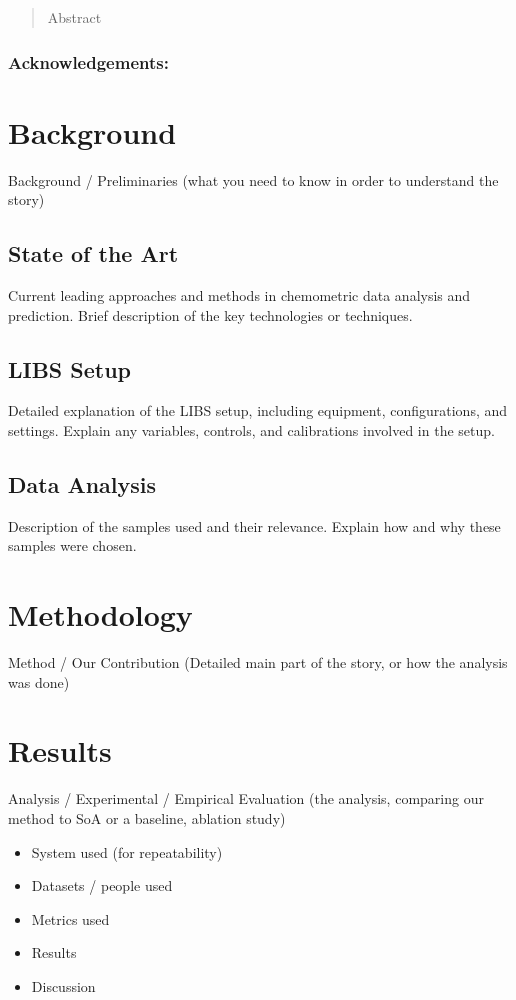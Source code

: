 
\newpage

\begin{abstract}
Abstract
\end{abstract}

\maketitle

\subsubsection*{Acknowledgements:}



\section{Background}
Background / Preliminaries (what you need to know in order to understand the story)
\subsection{State of the Art}
Current leading approaches and methods in chemometric data analysis and prediction.
Brief description of the key technologies or techniques.



\subsection{LIBS Setup}
Detailed explanation of the LIBS setup, including equipment, configurations, and settings.
Explain any variables, controls, and calibrations involved in the setup.

\subsection{Data Analysis}
Description of the samples used and their relevance.
Explain how and why these samples were chosen.

\section{Methodology}
Method / Our Contribution (Detailed main part of the story, or how the analysis was done)

\section{Results}
Analysis / Experimental / Empirical Evaluation (the analysis, comparing our method to SoA or a baseline, ablation study)
\begin{itemize}
    \item System used (for repeatability)
    \item Datasets / people used
    \item Metrics used
    \item Results
    \item Discussion
\end{itemize}


